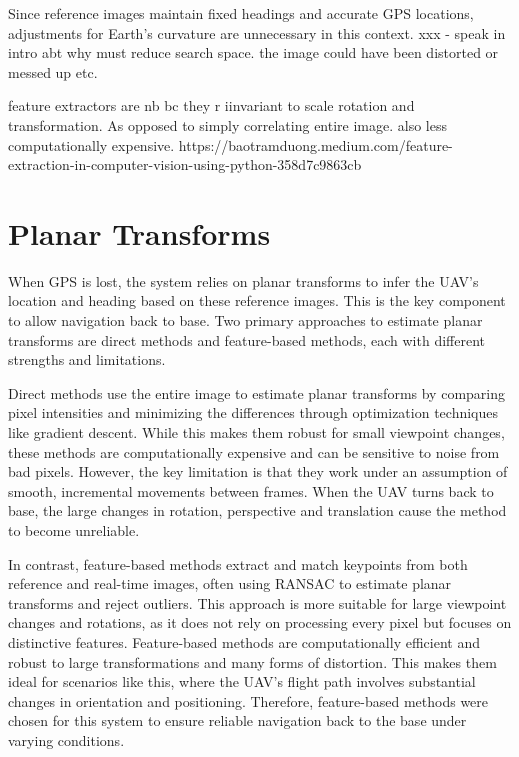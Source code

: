 
Since reference images maintain fixed headings and accurate GPS locations, adjustments for Earth's curvature are unnecessary in this context.
xxx - speak in intro abt why must reduce search space.  the image could have been distorted or messed up etc. 
    
feature extractors are nb bc they r iinvariant to scale rotation and transformation. As opposed to simply correlating entire image. also less computationally expensive.
https://baotramduong.medium.com/feature-extraction-in-computer-vision-using-python-358d7c9863cb



\section*{Planar Transforms}

When GPS is lost, the system relies on planar transforms to infer the UAV's location and heading based on these reference images. This is the key component to allow navigation back to base. Two primary approaches to estimate planar transforms are direct methods and feature-based methods, each with different strengths and limitations. \cite{lindenberger2023lightglue}

Direct methods use the entire image to estimate planar transforms by comparing pixel intensities and minimizing the differences through optimization techniques like gradient descent. While this makes them robust for small viewpoint changes, these methods are computationally expensive and can be sensitive to noise from bad pixels. However, the key limitation is that they work under an assumption of smooth, incremental movements between frames. When the UAV turns back to base, the large changes in rotation, perspective and translation cause the method to become unreliable. \cite{lindenberger2023lightglue}

In contrast, feature-based methods extract and match keypoints from both reference and real-time images, often using RANSAC to estimate planar transforms and reject outliers. This approach is more suitable for large viewpoint changes and rotations, as it does not rely on processing every pixel but focuses on distinctive features. Feature-based methods are computationally efficient and robust to large transformations and many forms of distortion. This makes them ideal for scenarios like this, where the UAV's flight path involves substantial changes in orientation and positioning. Therefore, feature-based methods were chosen for this system to ensure reliable navigation back to the base under varying conditions. \cite{lindenberger2023lightglue}


